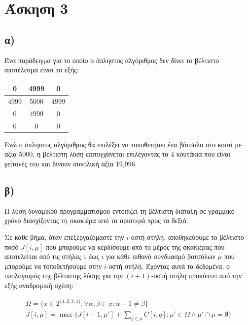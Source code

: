 \documentclass[11pt,a4paper]{book}
\begin{document}
\section*{Άσκηση 3}
\subsection*{α)}
Ένα παράδειγμα για το οποίο ο άπληστος αλγόριθμος δεν δίνει το βέλτιστο αποτέλεσμα είναι το εξής:

\vspace{3mm}
\begin{doublespace}
\begin{tabular}{|c|c|c|}
	\hline
	0    & 4999 & 0    \\ \hline
	4999 & 5000 & 4999 \\ \hline
	0    & 4999 & 0    \\ \hline
	0    &    0 & 0    \\ \hline
\end{tabular}
\end{doublespace}
\vspace{3mm}

Ενώ ο άπληστος αλγόριθμος θα επιλέξει να τοποθετήσει ένα βότσαλο
στο κουτί με αξία 5000, η βέλτιστη λύση επιτυγχάνεται επιλέγοντας
τα 4 κουτάκια που είναι γείτονές του και δίνουν συνολική αξία 19,996.

\subsection*{β)}
Η λύση δυναμικού προγραμματισμού εντοπίζει τη βέλτιστη διάταξη σε γραμμικό χρόνο διασχίζοντας τη σκακιέρα από τα αριστερά προς τα δεξιά.

Σε κάθε βήμα, όταν επεξεργαζόμαστε την $i$-οστή στήλη, αποθηκεύουμε το βέλτιστο ποσό $J[ i, \mu ]$ που μπορούμε να κερδίσουμε από το μέρος της σκακιέρας που αποτελείται από τις στήλες $1$ έως $i$ για κάθε πιθανό συνδυασμό βοτσάλων $\mu$ που μπορούμε να τοποθετήσουμε στην $i$-οστή στήλη. Έχοντας αυτά τα δεδομένα, ο υπολογισμός της βέλτιστης λύσης για την $(i + 1)$-οστή στήλη προκύπτει από την εξής αναδρομική σχέση:

\begin{align*}
	\Omega = \{ x \in 2^{\{1, 2, 3, 4\}}: \forall \alpha, \beta \in x: \alpha - 1 \neq \beta \}\\
	J[ i, \mu ] = \max\{J[ i - 1, \mu' ] + \sum_{q \in \mu}{C[ i, q ]}: \mu' \in \Omega \land \mu' \cap \mu = \emptyset\}
\end{align*}
\end{document}
